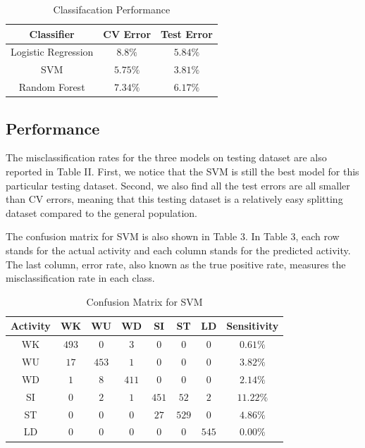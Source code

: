 \documentclass[conference]{IEEEtran}
\begin{document}
\begin{table}[htbp]
\renewcommand{\arraystretch}{1.3}
\caption{Classifacation Performance}
\label{Classifacation Performance}
\centering
\begin{tabular}{ccc}
\hline\hline
Classifier&CV Error&Test Error\\
\hline
Logistic Regression&$8.8\%$&$5.84\%$\\
SVM&$5.75\%$&$3.81\%$\\
Random Forest&$7.34\%$&$6.17\%$\\
\hline\hline
\end{tabular}
\end{table}

\subsection{Performance}
The misclassification rates for the three models on testing dataset are also reported in Table II. First, we notice that the SVM is still the best model for this particular testing dataset. Second, we also find all the test errors are all smaller than CV errors, meaning that this testing dataset is a relatively easy splitting dataset compared to the general population.

The confusion matrix for SVM is also shown in Table 3. In Table 3, each row stands for the actual activity and each column stands for the predicted activity. The last column, error rate, also known as the true positive rate, measures the misclassification rate in each class.

\begin{table}[htbp]
\renewcommand{\arraystretch}{1.3}
\caption{Confusion Matrix for SVM}
\centering
\begin{tabular}{cccccccc}
\hline\hline
Activity&WK&WU&WD&SI&ST&LD&Sensitivity\\
\hline
WK&$493$&$0$&$3$&$0$&$0$&$0$&$0.61\%$\\
WU&$17$&$453$&$1$&$0$&$0$&$0$&$3.82\%$\\
WD&$1$&$8$&$411$&$0$&$0$&$0$&$2.14\%$\\
SI&$0$&$2$&$1$&$451$&$52$&$2$&$11.22\%$\\
ST&$0$&$0$&$0$&$27$&$529$&$0$&$4.86\%$\\
LD&$0$&$0$&$0$&$0$&$0$&$545$&$0.00\%$\\
\hline\hline
\end{tabular}
\end{table}
\end{document}
